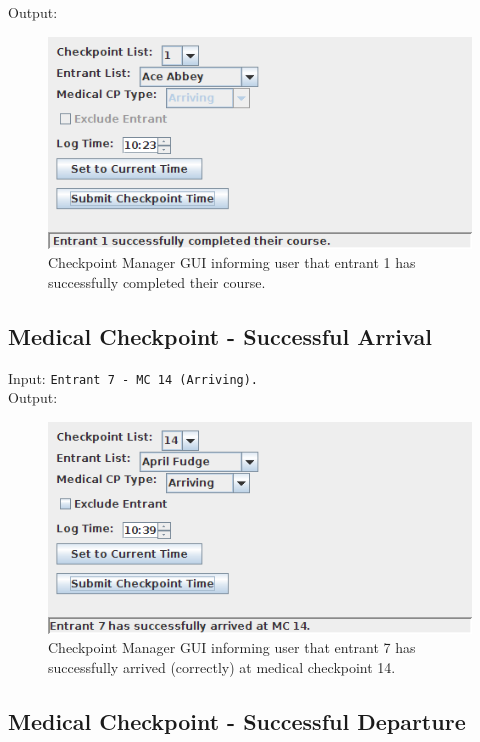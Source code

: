 \documentclass[a4paper, 10pt]{article}
\begin{document}
Output:
\begin{figure}[ht!]
\centering
\includegraphics[scale=0.7]{cm-finished.png}
\caption{Checkpoint Manager GUI informing user that entrant 1 has successfully completed their course.}
\end{figure}

\subsection{Medical Checkpoint - Successful Arrival}

Input: \verb+Entrant 7 - MC 14 (Arriving).+ \\

Output:
\begin{figure}[ht!]
\centering
\includegraphics[scale=0.7]{cm-mcarrivesuccess.png}
\caption{Checkpoint Manager GUI informing user that entrant 7 has successfully arrived (correctly) at medical checkpoint 14.}
\end{figure}

\clearpage
\subsection{Medical Checkpoint - Successful Departure}
\end{document}
